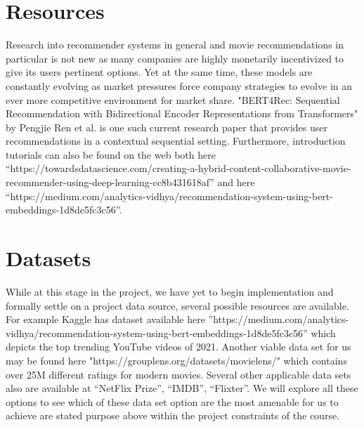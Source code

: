 \documentclass[10pt,twocolumn,letterpaper]{article}
\begin{document}
\section{Resources}

Research into recommender systems in general and movie recommendations in particular is not new as many companies are highly monetarily incentivized to give its users pertinent options.  Yet at the same time, these models are constantly evolving as market pressures force company strategies to evolve in an ever more competitive environment for market share. "BERT4Rec: Sequential Recommendation with Bidirectional Encoder Representations from Transformers" by Pengjie Ren et al. is one such current research paper that provides user recommendations in a contextual sequential setting.  Furthermore, introduction tutorials can also be found on the web both here “https://towardsdatascience.com/creating-a-hybrid-content-collaborative-movie-recommender-using-deep-learning-cc8b431618af” and here “https://medium.com/analytics-vidhya/recommendation-system-using-bert-embeddings-1d8de5fc3c56”.


\section{Datasets}

While at this stage in the project, we have yet to begin implementation and formally settle on a project data source, several possible resources are available.  For example Kaggle has dataset available here ”https://medium.com/analytics-vidhya/recommendation-system-using-bert-embeddings-1d8de5fc3c56” which depicts the top trending YouTube videos of 2021.  Another viable data set for us may be found here "https://grouplens.org/datasets/movielens/" which contains over 25M different ratings for modern movies.  Several other applicable data sets also are available at “NetFlix Prize”, “IMDB”, “Flixter”.  We will explore all these options to see which of these data set option are the most amenable for us to achieve are stated purpose above within the project constraints of the course.
\end{document}
